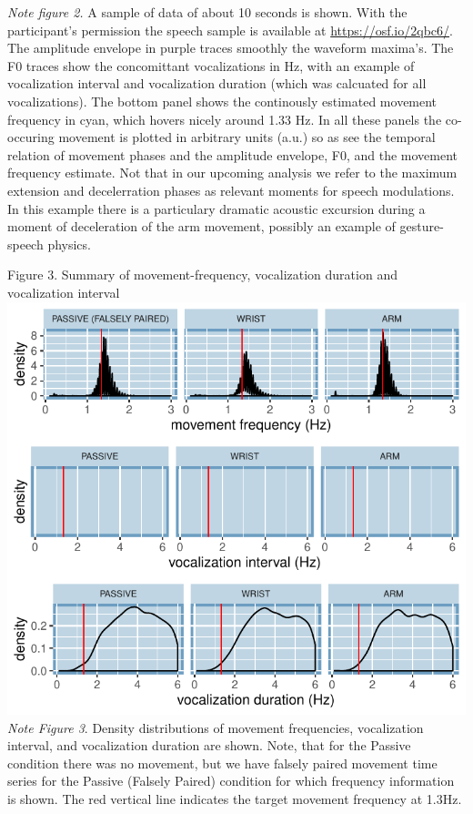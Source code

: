 \documentclass[
  man, noextraspace,floatsintext]{apa6}
\begin{document}
\emph{Note figure 2.} A sample of data of about 10 seconds is shown. With the participant's permission the speech sample is available at \url{https://osf.io/2qbc6/}. The amplitude envelope in purple traces smoothly the waveform maxima's. The F0 traces show the concomittant vocalizations in Hz, with an example of vocalization interval and vocalization duration (which was calcuated for all vocalizations). The bottom panel shows the continously estimated movement frequency in cyan, which hovers nicely around 1.33 Hz. In all these panels the co-occuring movement is plotted in arbitrary units (a.u.) so as see the temporal relation of movement phases and the amplitude envelope, F0, and the movement frequency estimate. Not that in our upcoming analysis we refer to the maximum extension and decelerration phases as relevant moments for speech modulations. In this example there is a particulary dramatic acoustic excursion during a moment of deceleration of the arm movement, possibly an example of gesture-speech physics.

Figure 3. Summary of movement-frequency, vocalization duration and vocalization interval
\includegraphics{GS_physics_in_fluid_speech_files/figure-latex/manipulation_checkplot-1.pdf}
\emph{Note Figure 3}. Density distributions of movement frequencies, vocalization interval, and vocalization duration are shown. Note, that for the Passive condition there was no movement, but we have falsely paired movement time series for the Passive (Falsely Paired) condition for which frequency information is shown. The red vertical line indicates the target movement frequency at 1.3Hz.
\end{document}
